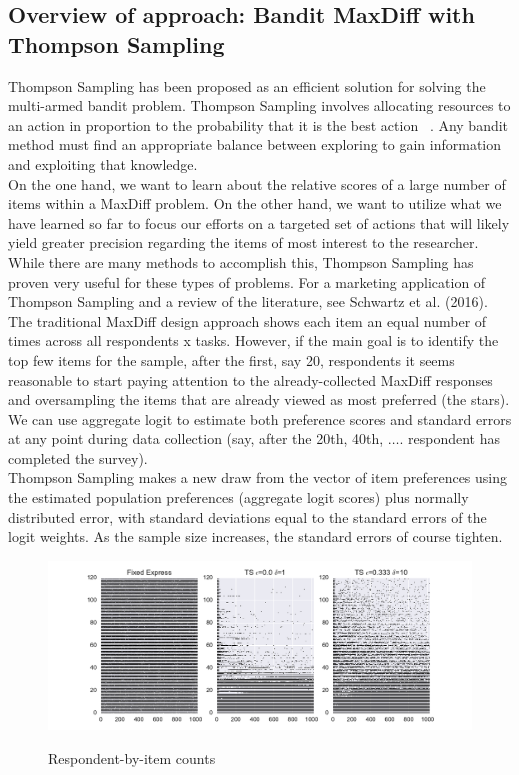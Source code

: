 \documentclass[nonblindrev]{informs3}
\begin{document}
\subsection{Overview of approach: Bandit MaxDiff with Thompson Sampling}
Thompson Sampling has been proposed as an efficient solution for solving the multi-armed bandit problem.  Thompson Sampling involves allocating resources to an action in proportion to the probability that it is the best action ~\cite{thompson1933likelihood}.  Any bandit method must find an appropriate balance between exploring to gain information and exploiting that knowledge.\\
On the one hand, we want to learn about the relative scores of a large number of items within a MaxDiff problem. On the other hand, we want to utilize what we have learned so far to focus our efforts on a targeted set of actions that will likely yield greater precision regarding the items of most interest to the researcher. While there are many methods to accomplish this, Thompson Sampling has proven very useful for these types of problems. For a marketing application of Thompson Sampling and a review of the literature, see Schwartz et al. (2016). \\
The traditional MaxDiff design approach shows each item an equal number of times across all respondents x tasks.  However, if the main goal is to identify the top few items for the sample, after the first, say 20, respondents it seems reasonable to start paying attention to the already-collected MaxDiff responses and oversampling the items that are already viewed as most preferred (the stars).  We can use aggregate logit to estimate both preference scores and standard errors at any point during data collection (say, after the 20th, 40th, $\ldots$. respondent has completed the survey).\\
Thompson Sampling makes a new draw from the vector of item preferences using the estimated population preferences (aggregate logit scores) plus normally distributed error, with standard deviations equal to the standard errors of the logit weights.  As the sample size increases, the standard errors of course tighten.\\
\begin{figure}[!ht]
\caption{Respondent-by-item counts}
\includegraphics[width=1\textwidth]{plots/3dotplot.pdf}
\label{fig:dots}
\end{figure}
\end{document}
